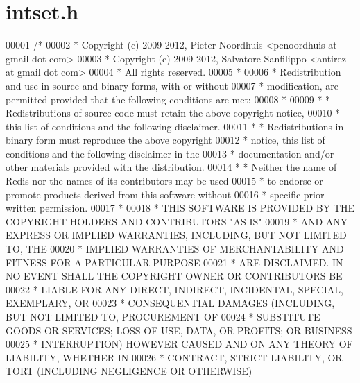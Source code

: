 \hypertarget{intset_8h_source}{}\section{intset.\+h}
\label{intset_8h_source}

\begin{DoxyCode}
00001 \textcolor{comment}{/*}
00002 \textcolor{comment}{ * Copyright (c) 2009-2012, Pieter Noordhuis <pcnoordhuis at gmail dot com>}
00003 \textcolor{comment}{ * Copyright (c) 2009-2012, Salvatore Sanfilippo <antirez at gmail dot com>}
00004 \textcolor{comment}{ * All rights reserved.}
00005 \textcolor{comment}{ *}
00006 \textcolor{comment}{ * Redistribution and use in source and binary forms, with or without}
00007 \textcolor{comment}{ * modification, are permitted provided that the following conditions are met:}
00008 \textcolor{comment}{ *}
00009 \textcolor{comment}{ *   * Redistributions of source code must retain the above copyright notice,}
00010 \textcolor{comment}{ *     this list of conditions and the following disclaimer.}
00011 \textcolor{comment}{ *   * Redistributions in binary form must reproduce the above copyright}
00012 \textcolor{comment}{ *     notice, this list of conditions and the following disclaimer in the}
00013 \textcolor{comment}{ *     documentation and/or other materials provided with the distribution.}
00014 \textcolor{comment}{ *   * Neither the name of Redis nor the names of its contributors may be used}
00015 \textcolor{comment}{ *     to endorse or promote products derived from this software without}
00016 \textcolor{comment}{ *     specific prior written permission.}
00017 \textcolor{comment}{ *}
00018 \textcolor{comment}{ * THIS SOFTWARE IS PROVIDED BY THE COPYRIGHT HOLDERS AND CONTRIBUTORS "AS IS"}
00019 \textcolor{comment}{ * AND ANY EXPRESS OR IMPLIED WARRANTIES, INCLUDING, BUT NOT LIMITED TO, THE}
00020 \textcolor{comment}{ * IMPLIED WARRANTIES OF MERCHANTABILITY AND FITNESS FOR A PARTICULAR PURPOSE}
00021 \textcolor{comment}{ * ARE DISCLAIMED. IN NO EVENT SHALL THE COPYRIGHT OWNER OR CONTRIBUTORS BE}
00022 \textcolor{comment}{ * LIABLE FOR ANY DIRECT, INDIRECT, INCIDENTAL, SPECIAL, EXEMPLARY, OR}
00023 \textcolor{comment}{ * CONSEQUENTIAL DAMAGES (INCLUDING, BUT NOT LIMITED TO, PROCUREMENT OF}
00024 \textcolor{comment}{ * SUBSTITUTE GOODS OR SERVICES; LOSS OF USE, DATA, OR PROFITS; OR BUSINESS}
00025 \textcolor{comment}{ * INTERRUPTION) HOWEVER CAUSED AND ON ANY THEORY OF LIABILITY, WHETHER IN}
00026 \textcolor{comment}{ * CONTRACT, STRICT LIABILITY, OR TORT (INCLUDING NEGLIGENCE OR OTHERWISE)}

\end{DoxyCode}
